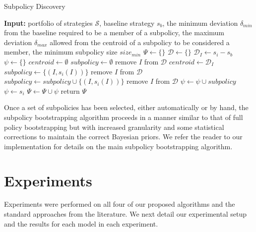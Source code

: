\documentclass{aamas2013}
\begin{document}
    \begin{algorithm}
    \caption{Subpolicy Discovery}
    \label{alg-subpolicydiscovery}
    \begin{algorithmic}[1]
    \STATE \textbf{Input:} portfolio of strategies $\mathcal{S}$, baseline strategy $s_b$, the minimum deviation $\delta_{min}$ from the baseline required to be a member of a subpolicy, the maximum deviation $\delta_{max}$ allowed from the centroid of a subpolicy to be considered a member, the minimum subpolicy size $size_{min}$
    \STATE $\Psi \leftarrow \{\}$
        \STATE $\mathcal{D} \leftarrow \{\}$
            \STATE $\mathcal{D}_{I} \leftarrow s_i - s_b$
        \ENDFOR
        \STATE $\psi \leftarrow \{\}$
            \STATE $centroid \leftarrow \emptyset$
            \STATE $subpolicy \leftarrow \emptyset$
                    \STATE remove $I$ from $\mathcal{D}$
                    \STATE $centroid \leftarrow \mathcal{D}_I$
                    \STATE $subpolicy \leftarrow \{(I,s_i(I))\}$
                    \STATE remove $I$ from $\mathcal{D}$
                    \STATE $subpolicy \leftarrow subpolicy \cup \{(I,s_i(I))\}$
                    \STATE remove $I$ from $\mathcal{D}$
                \ENDIF
            \ENDFOR
                \STATE $\psi \leftarrow \psi \cup subpolicy$
            \ENDIF
        \ENDWHILE
        \IF{$\psi = \emptyset$}
            \STATE $\psi \leftarrow s_i$
        \ENDIF
        \STATE $\Psi \leftarrow \Psi \cup \psi$
    \ENDFOR
    \STATE return $\Psi$
    \end{algorithmic}
    \end{algorithm}

    Once a set of subpolicies has been selected, either automatically or by hand, the subpolicy bootstrapping algorithm proceeds in a manner similar to that of full policy bootstrapping but with increased granularity and some statistical corrections to maintain the correct Bayesian priors. We refer the reader to our implementation for details on the main subpolicy bootstrapping algorithm.

\section{Experiments}
Experiments were performed on all four of our proposed algorithms and the standard approaches from the literature. We next detail our experimental setup and the results for each model in each experiment.
\end{document}
